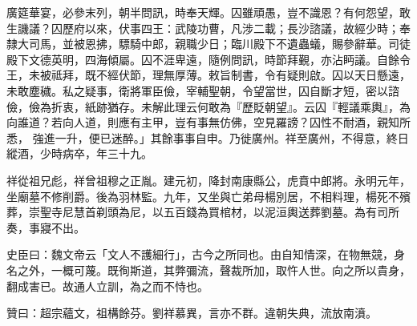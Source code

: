 \begin{pinyinscope}
 廣筵華宴，必參末列，朝半問訊，時奉天輝。囚雖頑愚，豈不識恩？有何怨望，敢生譏議？囚歷府以來，伏事四王：武陵功曹，凡涉二載；長沙諮議，故經少時；奉隸大司馬，並被恩拂，驃騎中郎，親職少日；臨川殿下不遺蟲蟻，賜參辭華。司徒殿下文德英明，四海傾屬。囚不涯卑遠，隨例問訊，時節拜覲，亦沾眄議。自餘令王，未被祗拜，既不經伏節，理無厚薄。敕旨制書，令有疑則啟。囚以天日懸遠，未敢塵穢。私之疑事，衛將軍臣儉，宰輔聖朝，令望當世，囚自斷才短，密以諮儉，儉為折衷，紙跡猶存。未解此理云何敢為『歷貶朝望』。云囚『輕議乘輿』，為向誰道？若向人道，則應有主甲，豈有事無仿佛，空見羅謗？囚性不耐酒，親知所悉，
 強進一升，便已迷醉。」其餘事事自申。乃徙廣州。祥至廣州，不得意，終日縱酒，少時病卒，年三十九。



 祥從祖兄彪，祥曾祖穆之正胤。建元初，降封南康縣公，虎賁中郎將。永明元年，坐廟墓不修削爵。後為羽林監。九年，又坐與亡弟母楊別居，不相料理，楊死不殯葬，崇聖寺尼慧首剃頭為尼，以五百錢為買棺材，以泥洹輿送葬劉墓。為有司所奏，事寢不出。



 史臣曰：魏文帝云「文人不護細行」，古今之所同也。由自知情深，在物無競，身名之外，一概可蔑。既徇斯道，其弊彌流，聲裁所加，取忤人世。向之所以貴身，翻成害已。故通人立訓，為之而不恃也。



 贊曰：超宗蘊文，祖構餘芬。劉祥慕異，言亦不群。違朝失典，流放南濆。



\end{pinyinscope}